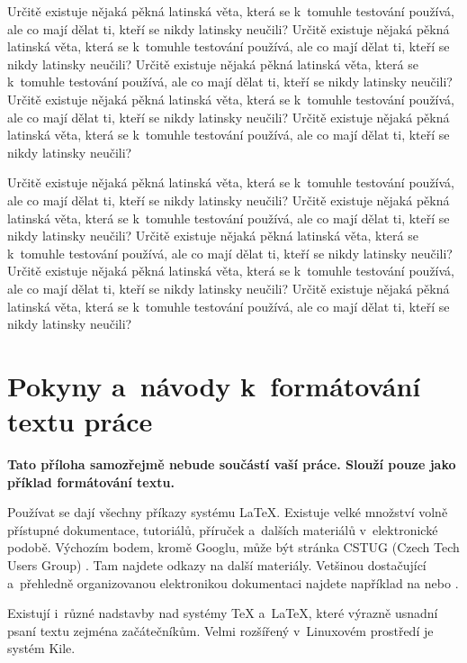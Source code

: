 \documentclass[11pt,twoside,a4paper]{book}
\begin{document}
Určitě existuje nějaká pěkná latinská věta, která se k~tomuhle testování používá, ale co mají dělat ti, kteří se nikdy
latinsky neučili? Určitě existuje nějaká pěkná latinská věta, která se k~tomuhle testování používá, ale co mají dělat
ti, kteří se nikdy latinsky neučili? Určitě existuje nějaká pěkná latinská věta, která se k~tomuhle testování používá,
ale co mají dělat ti, kteří se nikdy latinsky neučili? Určitě existuje nějaká pěkná latinská věta, která se k~tomuhle
testování používá, ale co mají dělat ti, kteří se nikdy latinsky neučili? Určitě existuje nějaká pěkná latinská věta,
která se k~tomuhle testování používá, ale co mají dělat ti, kteří se nikdy latinsky neučili?

Určitě existuje nějaká pěkná latinská věta, která se k~tomuhle testování používá, ale co mají dělat ti, kteří se nikdy
latinsky neučili? Určitě existuje nějaká pěkná latinská věta, která se k~tomuhle testování používá, ale co mají dělat
ti, kteří se nikdy latinsky neučili? Určitě existuje nějaká pěkná latinská věta, která se k~tomuhle testování používá,
ale co mají dělat ti, kteří se nikdy latinsky neučili? Určitě existuje nějaká pěkná latinská věta, která se k~tomuhle
testování používá, ale co mají dělat ti, kteří se nikdy latinsky neučili? Určitě existuje nějaká pěkná latinská věta,
která se k~tomuhle testování používá, ale co mají dělat ti, kteří se nikdy latinsky neučili?


\chapter{Pokyny a~návody k~formátování textu práce}
\textbf{\large Tato příloha samozřejmě nebude součástí vaší práce. Slouží pouze jako příklad formátování textu.}

Používat se dají všechny příkazy systému \LaTeX. Existuje velké množství volně přístupné dokumentace, tutoriálů,
příruček a~dalších materiálů v~elektronické podobě. Výchozím bodem, kromě Googlu, může být stránka CSTUG (Czech Tech
Users Group) \cite{CSTUG}. Tam najdete odkazy na další materiály.  Vetšinou dostačující a~přehledně organizovanou
elektronikou dokumentaci najdete například na \cite{latexdocweb} nebo \cite{latexwiki}.

Existují i~různé nadstavby nad systémy \TeX{} a~\LaTeX, které výrazně usnadní psaní textu zejména začátečníkům. Velmi
rozšířený v~Linuxovém prostředí je systém Kile.
\end{document}
